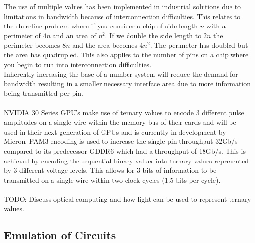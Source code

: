 \documentclass[12pt]{article}
\begin{document}
The use of multiple values has been implemented in industrial solutions due to limitations in bandwidth because of interconnection difficulties. 
This relates to the shoreline problem where if you consider a chip of side length $n$ with a perimeter 
of $4n$ and an area of $n^{2}$. If we double the side length to $2n$ the perimeter becomes $8n$ and the area becomes $4n^{2}$. The perimeter 
has doubled but the area has quadrupled. This also applies to the number of pins on a chip where you begin to run into interconnection 
difficulties.\\
Inherently increasing the base of a number system will reduce the demand for bandwidth resulting in a smaller necessary interface area 
due to more information being transmitted per pin.\\
\\
NVIDIA 30 Series GPU's make use of ternary values to encode 3 different pulse amplitudes on a single wire within the memory bus of their cards 
and will be used in their next generation of GPUs and is currently in development by Micron.
PAM3 encoding is used to increase the single pin throughput 32Gb/s compared to its predecessor GDDR6 which had a throughput of 18Gb/s. This 
is achieved by encoding the sequential binary values into ternary values represented by 3 different voltage levels. This allows for 3 bits 
of information to be transmitted on a single wire within two clock cycles (1.5 bits per cycle).\\
\\
TODO: Discuss optical computing and how light can be used to represent ternary values.\\

\subsection{Emulation of Circuits}
\end{document}
